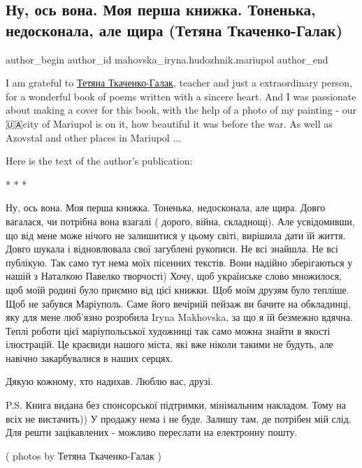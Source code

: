  
 
 
 
 

\subsection{Ну, ось вона. Моя перша книжка. Тоненька, недосконала, але щира (Тетяна Ткаченко-Галак)}
\label{sec:31_03_2023.fb.mahovska_iryna.hudozhnik.mariupol.1.tetjana_tkachenko_galak_knizhka}

\ifcmt
 author_begin
   author_id mahovska_iryna.hudozhnik.mariupol
 author_end
\fi

I am grateful to
\href{https://www.facebook.com/profile.php?id=100034532776327}{Тетяна Ткаченко-Галак}, 
teacher and just a extraordinary person, for a wonderful book
of poems written with a sincere heart. And I was passionate about making a
cover for this book, with the help of a photo of my painting - our 🇺🇦city of
Mariupol is on it, how beautiful it was before the war. As well as Azovstal and
other places in Mariupol ...

Here is  the text of the author's publication:

* * *

Ну, ось вона. Моя перша книжка. Тоненька, недосконала, але щира. Довго
вагалася, чи потрібна вона взагалі ( дорого, війна, складнощі). Але
усвідомивши, що від мене може нічого не залишитися у цьому світі, вирішила дати
їй життя. Довго шукала і відновлювала свої загублені рукописи. Не всі знайшла.
Не всі публікую. Так само тут нема моїх пісенних текстів. Вони надійно
зберігаються у нашій з  Наталкою Павелко творчості) Хочу, щоб українське слово
множилося, щоб моїй родині було приємно від цієї книжки. Щоб моїм друзям було
тепліше. Щоб не забувся Маріуполь. Саме його вечірній пейзаж ви бачите на
обкладинці, яку для мене люб'язно розробила Iryna Makhovska, за що я їй
безмежно вдячна. Теплі роботи цієї маріупольської художниці так само можна
знайти в якості ілюстрацій. Це краєвиди нашого міста, які вже ніколи такими не
будуть, але навічно закарбувалися в наших серцях. 

Дякую кожному, хто надихав. Люблю вас, друзі.

P.S. Книга видана без спонсорської підтримки, мінімальним накладом. Тому на
всіх не вистачить))  У продажу нема і не буде. Залишу там, де потрібен мій
слід. Для решти зацікавлених - можливо переслати на електронну пошту.

( photos by Тетяна Ткаченко-Галак )

